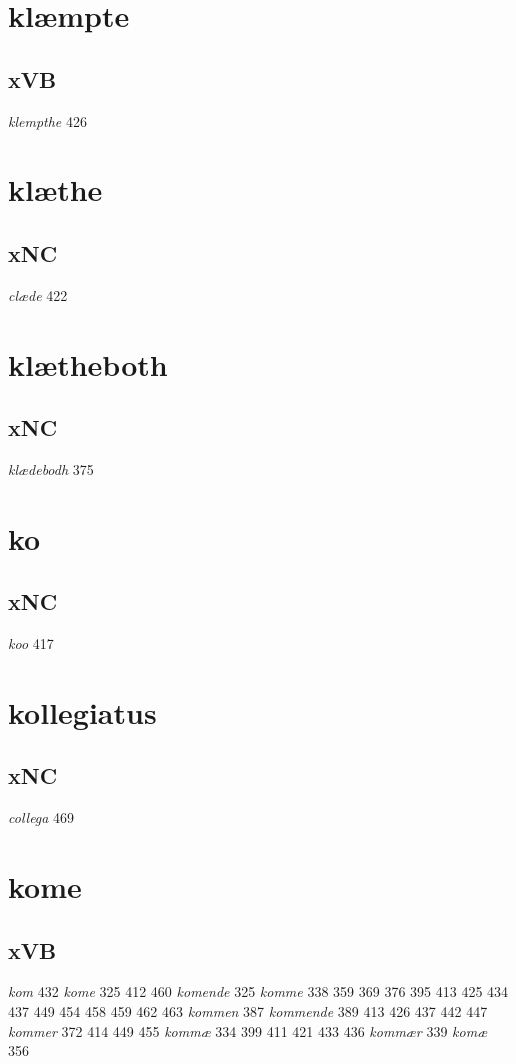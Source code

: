 \documentclass[a4paper,twocolumn]{article}
\begin{document}
\section{klæmpte}
\label{sec:org3a4e9c8}
\subsection{xVB}
\label{sec:org2e22636}
\emph{klempthe} 426 
\section{klæthe}
\label{sec:org9115b0d}
\subsection{xNC}
\label{sec:org7d0e4c9}
\emph{clæde} 422 
\section{klætheboth}
\label{sec:org25fbd43}
\subsection{xNC}
\label{sec:org77a2b25}
\emph{klædebodh} 375 
\section{ko}
\label{sec:org62fdca3}
\subsection{xNC}
\label{sec:orgb782719}
\emph{koo} 417 
\section{kollegiatus}
\label{sec:orgb190964}
\subsection{xNC}
\label{sec:org22fb4d4}
\emph{collega} 469 
\section{kome}
\label{sec:orgd23a8b3}
\subsection{xVB}
\label{sec:org3c95825}
\emph{kom} 432 \emph{kome} 325 412 460 \emph{komende} 325 \emph{komme} 338 359 369 376 395 413 425 434 437 449 454 458 459 462 463 \emph{kommen} 387 \emph{kommende} 389 413 426 437 442 447 \emph{kommer} 372 414 449 455 \emph{kommæ} 334 399 411 421 433 436 \emph{kommær} 339 \emph{komæ} 356 
\end{document}
